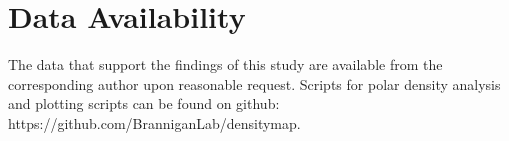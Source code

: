 \documentclass[9pt]{article}
\begin{document}
\section{Data Availability }

The data that support the findings of this study are available from the corresponding author upon reasonable request. Scripts for polar density analysis and plotting scripts can be found on github: https://github.com/BranniganLab/densitymap. 
\end{document}
